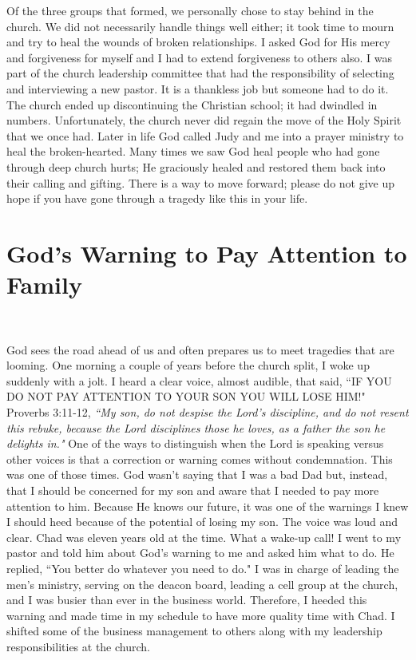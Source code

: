 \documentclass[oneside]{book}
\begin{document}
Of the three groups that formed, we personally chose to stay behind in the church. We did not necessarily handle things well either; it took time to mourn and try to heal the wounds of broken relationships. I asked God for His mercy and forgiveness for myself and I had to extend forgiveness to others also. I was part of the church leadership committee that had the responsibility of selecting and interviewing a new pastor. It is a thankless job but someone had to do it. The church ended up discontinuing the Christian school; it had dwindled in numbers. Unfortunately, the church never did regain the move of the Holy Spirit that we once had. Later in life God called Judy and me into a prayer ministry to heal the broken-hearted. Many times we saw God heal people who had gone through deep church hurts; He graciously healed and restored them back into their calling and gifting. There is a way to move forward; please do not give up hope if you have gone through a tragedy like this in your life.


\section{God's Warning to Pay Attention to Family}
\

God sees the road ahead of us and often prepares us to meet tragedies that are looming. One morning a couple of years before the church split, I woke up suddenly with a jolt. I heard a clear voice, almost audible, that said, ``IF YOU DO NOT PAY ATTENTION TO YOUR SON YOU WILL LOSE HIM!" Proverbs 3:11-12, \textit{``My son, do not despise the Lord's discipline, and do not resent this rebuke, because the Lord disciplines those he loves, as a father the son he delights in."} One of the ways to distinguish when the Lord is speaking versus other voices is that a correction or warning comes without condemnation. This was one of those times. God wasn't saying that I was a bad Dad but, instead, that I should be concerned for my son and aware that I needed to pay more attention to him. Because He knows our future, it was one of the warnings I knew I should heed because of the potential of losing my son. The voice was loud and clear. Chad was eleven years old at the time. What a wake-up call! I went to my pastor and told him about God's warning to me and asked him what to do. He replied, ``You better do whatever you need to do." I was in charge of leading the men's ministry, serving on the deacon board, leading a cell group at the church, and I was busier than ever in the business world. Therefore, I heeded this warning and made time in my schedule to have more quality time with Chad. I shifted some of the business management to others along with my leadership responsibilities at the church.
\end{document}
